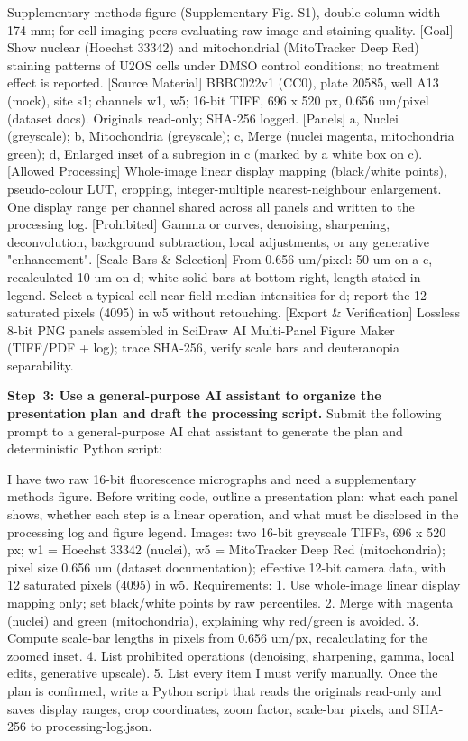 \begin{Prompt}
 Supplementary methods figure (Supplementary Fig. S1), double-column
width 174 mm; for cell-imaging peers evaluating raw image and staining quality.
[Goal] Show nuclear (Hoechst 33342) and mitochondrial (MitoTracker Deep Red) staining
patterns of U2OS cells under DMSO control conditions; no treatment effect is reported.
[Source Material] BBBC022v1 (CC0), plate 20585, well A13 (mock), site s1; channels w1, w5;
16-bit TIFF, 696 x 520 px, 0.656 um/pixel (dataset docs). Originals read-only; SHA-256 logged.
[Panels] a, Nuclei (greyscale); b, Mitochondria (greyscale); c, Merge (nuclei magenta,
mitochondria green); d, Enlarged inset of a subregion in c (marked by a white box on c).
[Allowed Processing] Whole-image linear display mapping (black/white points), pseudo-colour
LUT, cropping, integer-multiple nearest-neighbour enlargement. One display range per channel
shared across all panels and written to the processing log.
[Prohibited] Gamma or curves, denoising, sharpening, deconvolution, background subtraction,
local adjustments, or any generative "enhancement".
[Scale Bars & Selection] From 0.656 um/pixel: 50 um on a-c, recalculated 10 um on d; white
solid bars at bottom right, length stated in legend. Select a typical cell near field median
intensities for d; report the 12 saturated pixels (4095) in w5 without retouching.
[Export & Verification] Lossless 8-bit PNG panels assembled in SciDraw AI Multi-Panel Figure
Maker (TIFF/PDF + log); trace SHA-256, verify scale bars and deuteranopia separability.
\end{Prompt}

\textbf{Step~3: Use a general-purpose AI assistant to organize the presentation plan and draft the processing script.} Submit the following prompt to a general-purpose AI chat assistant to generate the plan and deterministic Python script:

\begin{Prompt}
I have two raw 16-bit fluorescence micrographs and need a supplementary methods figure.
Before writing code, outline a presentation plan: what each panel shows, whether each step
is a linear operation, and what must be disclosed in the processing log and figure legend.
Images: two 16-bit greyscale TIFFs, 696 x 520 px; w1 = Hoechst 33342 (nuclei),
w5 = MitoTracker Deep Red (mitochondria); pixel size 0.656 um (dataset documentation);
effective 12-bit camera data, with 12 saturated pixels (4095) in w5.
Requirements:
1. Use whole-image linear display mapping only; set black/white points by raw percentiles.
2. Merge with magenta (nuclei) and green (mitochondria), explaining why red/green is avoided.
3. Compute scale-bar lengths in pixels from 0.656 um/px, recalculating for the zoomed inset.
4. List prohibited operations (denoising, sharpening, gamma, local edits, generative upscale).
5. List every item I must verify manually.
Once the plan is confirmed, write a Python script that reads the originals read-only and saves
display ranges, crop coordinates, zoom factor, scale-bar pixels, and SHA-256 to processing-log.json.
\end{Prompt}


